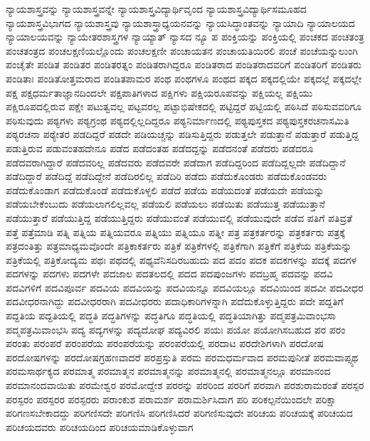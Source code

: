 {ನ್ಯಾಯಶಾಸ್ತ್ರವನ್ನು
ನ್ಯಾಯಶಾಸ್ತ್ರವನ್ನೇ
ನ್ಯಾಯಶಾಸ್ತ್ರವಿದ್ಯಾರ್ಥಿವೃಂದ
ನ್ಯಾಯಶಾಸ್ತ್ರವಿದ್ಯಾರ್ಥಿಸಮೂಹದ
ನ್ಯಾಯಶಾಸ್ತ್ರವಿಭಾಗದ
ನ್ಯಾಯಶಾಸ್ತ್ರವು
ನ್ಯಾಯಶಾಸ್ತ್ರಾಧ್ಯಯನವನ್ನು
ನ್ಯಾಯಸಿದ್ಧಾಂತವನ್ನು
ನ್ಯಾಯಾದಿ
ನ್ಯಾಯಾಲಯದ
ನ್ಯಾಯಾಲಯವನ್ನು
ನ್ಯಾಯೇತರಶಾಸ್ತ್ರಗಳ
ನ್ಯಾಯ್ಯಾತ್
ನ್ಯಾಸದ
ನ್ಯೂ
ಪ
ಪಂಕ್ತಿಯನ್ನು
ಪಂಕ್ತಿಯಲ್ಲಿ
ಪಂಚಕದ
ಪಂಚತಂತ್ರ
ಪಂಚತಂತ್ರದ
ಪಂಚಲಕ್ಷಣಿಯಲ್ಲೊಂದು
ಪಂಚಲಕ್ಷಣೀ
ಪಂಚಾಯತನ
ಪಂಚಾಯತಿಯಿರಲಿ
ಪಂಚೆ
ಪಂಚೆಯನ್ನುಲುಂಗಿ
ಪಂಚೈತೇ
ಪಂಡಿತ
ಪಂಡಿತರ
ಪಂಡಿತರತ್ನಂ
ಪಂಡಿತರಾಗಿದ್ದರೂ
ಪಂಡಿತರಾದ
ಪಂಡಿತರಾದವರಿಗೆ
ಪಂಡಿತರಿಗೆ
ಪಂಡಿತರು
ಪಂಡಿತಾಃ
ಪಂಡಿತೋತ್ತಮರಾದ
ಪಂಡಿತಪಾಮರ
ಪಂಥ
ಪಂಥಗಳೂ
ಪಂಥದ
ಪಕ್ಕದ
ಪಕ್ಕದಲ್ಲಿಯೇ
ಪಕ್ಕದಲ್ಲೆ
ಪಕ್ಕದಲ್ಲೇ
ಪಕ್ಷ
ಪಕ್ಷಧರ್ಮತಾಜ್ಞಾನದಿಂದಲೇ
ಪಕ್ಷಪಾತಿಗಳಾದ
ಪಕ್ಷಿಗಳು
ಪಕ್ಷಿಯರೂಪವನ್ನು
ಪಕ್ಷಿಯಲ್ಲ
ಪಕ್ಷಿಯು
ಪಕ್ಷಿರೂಪದಲ್ಲಿರುವ
ಪಕ್ಷೇ
ಪಟುತ್ವವಲ್ಲ
ಪಟ್ಟವರಲ್ಲ
ಪಟ್ಟಾಭಿಷೇಕದಲ್ಲಿ
ಪಟ್ಟಿದ್ದರೆ
ಪಟ್ಟಿಯಲ್ಲಿ
ಪಠಿಸಿದೆ
ಪಠಿಸುವವರಿಗೂ
ಪಠಿಸುವುದು
ಪಠ್ಯಗಳು
ಪಠ್ಯಗ್ರಂಥ
ಪಠ್ಯದಲ್ಲಿಲ್ಲದಿದ್ದರೂ
ಪಠ್ಯನಿರ್ಮಾಣದಲ್ಲಿ
ಪಠ್ಯಪುಸ್ತಕದ
ಪಠ್ಯಪುಸ್ತಕರಚನಾಸಮಿತಿ
ಪಠ್ಯರಚನಾ
ಪಠ್ಯೇತರ
ಪಡದಿದ್ದರೆ
ಪಡದೇ
ಪಡಿಯಚ್ಚನ್ನು
ಪಡಿಸುತ್ತಿದ್ದರು
ಪಡುತ್ತಲೇ
ಪಡುತ್ತಾನೆ
ಪಡುತ್ತಾರೆ
ಪಡುತ್ತಿದ್ದ
ಪಡುತ್ತಿರುವ
ಪಡುವಂತಹದೇನೂ
ಪಡೆದ
ಪಡೆದಂತಹ
ಪಡೆದದ್ದನ್ನು
ಪಡೆದನಂತೆ
ಪಡೆದರು
ಪಡೆದರೂ
ಪಡೆದವರಾಗಿದ್ದಾರೆ
ಪಡೆದವರಿಲ್ಲ
ಪಡೆದವರು
ಪಡೆದವರೇ
ಪಡೆದಾಗ
ಪಡೆದಿದ್ದರಿಂದ
ಪಡೆದಿದ್ದಲ್ಲದೇ
ಪಡೆದಿದ್ದಾನೆ
ಪಡೆದಿದ್ದಾರೆ
ಪಡೆದಿದ್ದೆ
ಪಡೆದಿದ್ದೇನೆ
ಪಡೆದಿರಲಿಲ್ಲ
ಪಡೆದಿರಿ
ಪಡೆದು
ಪಡೆದುಕೊಂಡರು
ಪಡೆದುಕೊಂಡವರು
ಪಡೆದುಕೊಂಡಾಗ
ಪಡೆದುಕೊಂಡೆ
ಪಡೆದುಕೊಳ್ಳಲಿ
ಪಡೆದೆ
ಪಡೆಯ
ಪಡೆಯದಂತೆ
ಪಡೆಯದೇ
ಪಡೆಯನ್ನು
ಪಡೆಯಬೇಕೆಂಬುದು
ಪಡೆಯಲಾಗಲಿಲ್ಲವಲ್ಲ
ಪಡೆಯಲಿ
ಪಡೆಯಲು
ಪಡೆಯಿತು
ಪಡೆಯುತ್ತ
ಪಡೆಯುತ್ತಾನೆ
ಪಡೆಯುತ್ತಾರೆ
ಪಡೆಯುತ್ತಿದ್ದ
ಪಡೆಯುತ್ತಿದ್ದರು
ಪಡೆಯುವಂತೆ
ಪಡೆಯುವಲ್ಲಿ
ಪಡೆಯುವುದೇ
ಪಡೆವ
ಪತಿಗೆ
ಪತಿವ್ರತೆ
ಪತ್ತೆ
ಪತ್ತೆಮಾಡಿ
ಪತ್ನಿ
ಪತ್ನಿಯ
ಪತ್ನಿಯವರೂ
ಪತ್ನಿಯು
ಪತ್ನಿಯೂ
ಪತ್ನೀ
ಪತ್ರ
ಪತ್ರಕರ್ತರನ್ನು
ಪತ್ರಕರ್ತರು
ಪತ್ರಕ್ಕೆ
ಪತ್ರದಂತಿತ್ತು
ಪತ್ರಮಾಧ್ಯಮವೊಂದೇ
ಪತ್ರಿಕಾಕರ್ತರು
ಪತ್ರಿಕೆ
ಪತ್ರಿಕೆಗಳಲ್ಲಿ
ಪತ್ರಿಕೆಗಾಗಿ
ಪತ್ರಿಕೆಗೆ
ಪತ್ರಿಕೆಯ
ಪತ್ರಿಕೆಯನ್ನು
ಪತ್ರಿಕೆಯಲ್ಲಿ
ಪತ್ರಿಕೋದ್ಯಮ
ಪಥಃ
ಪಥದಲ್ಲಿ
ಪಥ್ಯವೆನಿಸದಿರಬಹುದು
ಪದ
ಪದಂ
ಪದಕ
ಪದಕಗಳನ್ನು
ಪದಕ್ಕೆ
ಪದಗಳ
ಪದಗಳನ್ನು
ಪದಗಳು
ಪದಗಳೇ
ಪದಜಾಲ
ಪದತಲದಲ್ಲಿ
ಪದದ
ಪದಪುಂಜಗಳು
ಪದಬ್ರಹ್ಮ
ಪದವನ್ನು
ಪದವಿ
ಪದವಿಗಳಿಗೆ
ಪದವಿಪೂರ್ವ
ಪದವಿಯ
ಪದವಿಯನ್ನು
ಪದವಿಯನ್ನೂ
ಪದವಿಯಲ್ಲೂ
ಪದವಿಯಿಂದ
ಪದವೀ
ಪದವೀಧರ
ಪದವೀಧರನಾಗಿದ್ದು
ಪದವೀಧರರಾಗಿ
ಪದವೀಧರರು
ಪದಾಧಿಕಾರಿಗಳನ್ನಾಗಿ
ಪದೆದುಕೊಳ್ಳುತ್ತಿದ್ದರು
ಪದೇ
ಪದ್ದತಿಗೆ
ಪದ್ದತಿಯ
ಪದ್ದತಿಯಲ್ಲಿ
ಪದ್ಧತಿ
ಪದ್ಧತಿಗಳನ್ನು
ಪದ್ಧತಿಗೂ
ಪದ್ಧತಿಯಲ್ಲಿ
ಪದ್ಧತಿಯಾಗಿತ್ತು
ಪದ್ಮಪತ್ರಮಿವಾಂಭಸಾ
ಪದ್ಮಪತ್ರಮಿವಾಂಭಸಿ
ಪದ್ಯ
ಪದ್ಯಗಳನ್ನು
ಪದ್ಯದೋಘ
ಪದ್ಯವಿರಲಿ
ಪಯಃ
ಪಯೋ
ಪಯೋಗಿಸಬಹುದ
ಪರ
ಪರಂ
ಪರಂತು
ಪರಂಪರೆ
ಪರಂಪರೆಯ
ಪರಂಪರೆಯನ್ನು
ಪರಂಪರೆಯಲ್ಲಿ
ಪರದಾಟ
ಪರದೇಶಿಗಳಾಗಿ
ಪರದೋಷ
ಪರದೋಷಗಳನ್ನು
ಪರದೋಷಗ್ರಹಣವಾದರೆ
ಪರಪ್ರಸ್ತುತಿ
ಪರಮ
ಪರಮಧರ್ಮವಾದ
ಪರಮಪುನೀತೆ
ಪರಮವಾಪ್ಸ್ಯಥ
ಪರಮಸಾರ್ಥಕ್ಯದ
ಪರಮಾತ್ಮ
ಪರಮಾತ್ಮನ
ಪರಮಾತ್ಮನನ್ನು
ಪರಮಾತ್ಮನಲ್ಲಿ
ಪರಮಾತ್ಮನಲ್ಲೂ
ಪರಮಾನಂದ
ಪರಮಾನಂದವಾಯಿತು
ಪರಮೇಶ್ವರ
ಪರಮೋದ್ದೇಶ
ಪರರನ್ನು
ಪರರಿಂದ
ಪರರಿಗೆ
ಪರವಾಗಿ
ಪರಶುರಾಮರಂತೆ
ಪರಸ್ಪರ
ಪರಸ್ಪರಂ
ಪರಸ್ಪರರ
ಪರಸ್ಪರರು
ಪರಾಂಕುಶ
ಪರಾಮರ್ಶ
ಪರಾಮರ್ಶಿಸಿದಾಗ
ಪರಿ
ಪರಿಕಲ್ಪನೆಯಿಂದಲೇ
ಪರಿಕ್ಷಾ
ಪರಿಗಣಸಬೇಕಾದದ್ದು
ಪರಿಗಣಿಸದೇ
ಪರಿಗಣಿಸಿ
ಪರಿಗಣಿಸಿದರೆ
ಪರಿಗಣಿಸುವುದೇ
ಪರಿಚಯ
ಪರಿಚಯಕ್ಕೆ
ಪರಿಚಯದ
ಪರಿಚಯದವರು
ಪರಿಚಯದಿಂದ
ಪರಿಚಯಮಾಡಿಕೊಳ್ಳುವಾಗ
}
